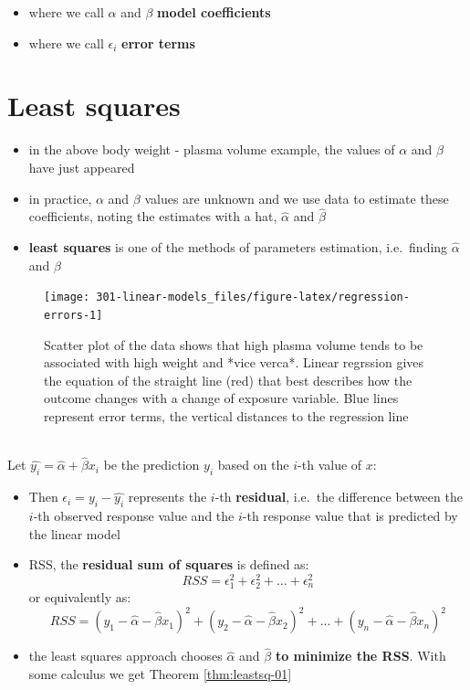 \documentclass[
]{book}
\providecommand{\tightlist}{%
  \setlength{\itemsep}{0pt}\setlength{\parskip}{0pt}}
\theoremstyle{definition}
\theoremstyle{definition}
\theoremstyle{definition}
\theoremstyle{remark}
\begin{document}
\begin{itemize}
\tightlist
\item
  where we call \(\alpha\) and \(\beta\) \textbf{model coefficients}
\item
  where we call \(\epsilon_i\) \textbf{error terms}
\end{itemize}

\hypertarget{least-squares}{%
\section{Least squares}\label{least-squares}}

\begin{itemize}
\tightlist
\item
  in the above body weight - plasma volume example, the values of \(\alpha\) and \(\beta\) have just appeared
\item
  in practice, \(\alpha\) and \(\beta\) values are unknown and we use data to estimate these coefficients, noting the estimates with a hat, \(\hat{\alpha}\) and \(\hat{\beta}\)
\item
  \textbf{least squares} is one of the methods of parameters estimation, i.e.~finding \(\hat{\alpha}\) and \(\hat{\beta}\)
\end{itemize}

\begin{figure}

{\centering \texttt{[image: 301-linear-models\_files/figure-latex/regression-errors-1]} 

}

\caption{Scatter plot of the data shows that high plasma volume tends to be associated with high weight and *vice verca*. Linear regrssion gives the equation of the straight line (red) that best describes how the outcome changes with a change of exposure variable. Blue lines represent error terms, the vertical distances to the regression line}\label{fig:regression-errors}
\end{figure}

~\\
Let \(\hat{y_i}=\hat{\alpha} + \hat{\beta}x_i\) be the prediction \(y_i\) based on the \(i\)-th value of \(x\):

\begin{itemize}
\tightlist
\item
  Then \(\epsilon_i = y_i - \hat{y_i}\) represents the \(i\)-th \textbf{residual}, i.e.~the difference between the \(i\)-th observed response value and the \(i\)-th response value that is predicted by the linear model
\item
  RSS, the \textbf{residual sum of squares} is defined as: \[RSS = \epsilon_1^2 + \epsilon_2^2 + \dots + \epsilon_n^2\] or
  equivalently as: \[RSS=(y_1-\hat{\alpha}-\hat{\beta}x_1)^2+(y_2-\hat{\alpha}-\hat{\beta}x_2)^2+...+(y_n-\hat{\alpha}-\hat{\beta}x_n)^2\]
\item
  the least squares approach chooses \(\hat{\alpha}\) and \(\hat{\beta}\) \textbf{to minimize the RSS}. With some calculus we get Theorem \ref{thm:leastsq-01}
\end{itemize}
\end{document}
